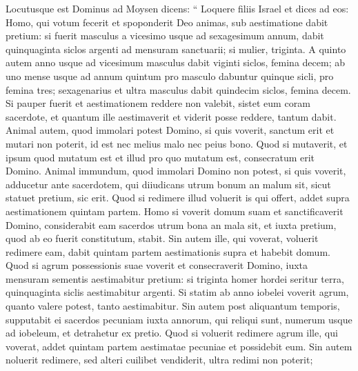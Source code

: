 \begin{biblechapter}
\begin{biblechapter}
\begin{biblechapter}
\begin{biblechapter}
\begin{biblechapter}
\begin{biblechapter}
\begin{biblechapter}
\begin{biblechapter}
\begin{biblechapter}
\begin{biblechapter}
\begin{biblechapter}
\begin{biblechapter}
\begin{biblechapter}
\begin{biblechapter}
\begin{biblechapter}
\begin{biblechapter}
\begin{biblechapter}
\begin{biblechapter}
\begin{biblechapter}
\begin{biblechapter}
\begin{biblechapter}
\begin{biblechapter}
\begin{biblechapter}
\begin{biblechapter}
\begin{biblechapter}
\begin{biblechapter}
\begin{biblechapter}
\verse Locutusque est Dominus ad Moysen dicens: 
\verse “ Loquere filiis Israel et dices ad eos: Homo, qui votum fecerit et spoponderit Deo animas, sub aestimatione dabit pretium: 
\verse si fuerit masculus a vicesimo usque ad sexagesimum annum, dabit quinquaginta siclos argenti ad mensuram sanctuarii; 
 \verse si mulier, triginta. 
\verse A quinto autem anno usque ad vicesimum masculus dabit viginti siclos, femina decem; 
\verse ab uno mense usque ad annum quintum pro masculo dabuntur quinque sicli, pro femina tres; 
\verse sexagenarius et ultra masculus dabit quindecim siclos, femina decem. 
\verse Si pauper fuerit et aestimationem reddere non valebit, sistet eum coram sacerdote, et quantum ille aestimaverit et viderit posse reddere, tantum dabit.
 \verse Animal autem, quod immolari potest Domino, si quis voverit, sanctum erit 
 \verse et mutari non poterit, id est nec melius malo nec peius bono. Quod si mutaverit, et ipsum quod mutatum est et illud pro quo mutatum est, consecratum erit Domino. 
\verse Animal immundum, quod immolari Domino non potest, si quis voverit, adducetur ante sacerdotem, 
\verse qui diiudicans utrum bonum an malum sit, sicut statuet pretium, sic erit. 
\verse Quod si redimere illud voluerit is qui offert, addet supra aestimationem quintam partem.
 \verse Homo si voverit domum suam et sanctificaverit Domino, considerabit eam sacerdos utrum bona an mala sit, et iuxta pretium, quod ab eo fuerit constitutum, stabit. 
\verse Sin autem ille, qui voverat, voluerit redimere eam, dabit quintam partem aestimationis supra et habebit domum.
 \verse Quod si agrum possessionis suae voverit et consecraverit Domino, iuxta mensuram sementis aestimabitur pretium: si triginta homer hordei seritur terra, quinquaginta siclis aestimabitur argenti. 
\verse Si statim ab anno iobelei voverit agrum, quanto valere potest, tanto aestimabitur. 
\verse Sin autem post aliquantum temporis, supputabit ei sacerdos pecuniam iuxta annorum, qui reliqui sunt, numerum usque ad iobeleum, et detrahetur ex pretio. 
\verse Quod si voluerit redimere agrum ille, qui voverat, addet quintam partem aestimatae pecuniae et possidebit eum. 
\verse Sin autem noluerit redimere, sed alteri cuilibet vendiderit, ultra redimi non poterit; 

\end{biblechapter}
\end{biblechapter}
\end{biblechapter}
\end{biblechapter}
\end{biblechapter}
\end{biblechapter}
\end{biblechapter}
\end{biblechapter}
\end{biblechapter}
\end{biblechapter}
\end{biblechapter}
\end{biblechapter}
\end{biblechapter}
\end{biblechapter}
\end{biblechapter}
\end{biblechapter}
\end{biblechapter}
\end{biblechapter}
\end{biblechapter}
\end{biblechapter}
\end{biblechapter}
\end{biblechapter}
\end{biblechapter}
\end{biblechapter}
\end{biblechapter}
\end{biblechapter}
\end{biblechapter}
